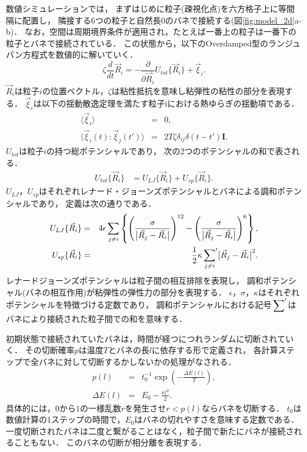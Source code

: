 数値シミュレーションでは，
まずはじめに粒子(疎視化点)を六方格子上に等間隔に配置し，
隣接する6つの粒子と自然長$0$のバネで接続する(図\ref{fig:model_2d}a-b)．
なお，空間は周期境界条件が適用され，たとえば一番上の粒子は一番下の粒子とバネで接続されている．
この状態から，以下のOverdamped型のランジュバン方程式を数値的に解いていく．
\begin{equation}
    \label{eq:main}
    \zeta
    \frac{d}{dt}
    \vec{R}_i
    =
    -\frac{\partial}{\partial\vec{R}_i}
    U_{tot}\{\vec{R}_i\}
    +\vec{\xi}_i
    .
\end{equation}
$\vec{R}_i$は粒子$i$の位置ベクトル，$\zeta$は粘性抵抗を意味し粘弾性の粘性の部分を表現する．
$\vec{\xi}_i$は以下の揺動散逸定理を満たす粒子iにおける熱ゆらぎの揺動項である．
\begin{eqnarray}
    \label{eq:langevin0}
    \langle\vec{\xi}_i\rangle &=& 0, \\
    \label{eq:langevin1}
    \langle\vec{\xi}_i(t):\vec{\xi}_j(t')\rangle &=& 2T\zeta\delta_{ij}\delta(t-t')\bm{I}.
\end{eqnarray}
$U_{tot}$は粒子$i$の持つ総ポテンシャルであり，
次の2つのポテンシャルの和で表される．
\begin{eqnarray}
    U_{tot}\{\vec{R}_i\}
    &=
     U_{LJ}\{\vec{R}_i\}
    +U_{sp}\{\vec{R}_i\}.
\end{eqnarray}
$U_{LJ}$，$U_{sp}$はそれぞれレナード・ジョーンズポテンシャルとバネによる調和ポテンシャルであり，
定義は次の通りである．
\begin{eqnarray}
    U_{LJ}\{\vec{R}_i\}
    &=&
    4\epsilon\sum_{j\neq i}
    \left\{
    \left(
    \frac{\sigma}{\bigl|\vec{R}_j-\vec{R}_i\bigr|}
    \right)^{12}
    -
    \left(
    \frac{\sigma}{\bigl|\vec{R}_j-\vec{R}_i\bigr|}
    \right)^{6}
    \right\},
    \\
    U_{sp}\{\vec{R}_i\}
    &=&
    \frac{1}{2}
    \kappa
    \sideset{}{'}\sum_{j\neq i}
    \bigl|\vec{R}_j-\vec{R}_i\bigr|^{2}.
\end{eqnarray}
レナードジョーンズポテンシャルは粒子間の相互排除を表現し，
調和ポテンシャル(バネの相互作用)が粘弾性の弾性力の部分を表現する．
$\epsilon$，$\sigma$，$\kappa$はそれぞれポテンシャルを特徴づける定数であり，
調和ポテンシャルにおける記号$\sideset{}{'}\sum$はバネにより接続された粒子間での和を意味する．

初期状態で接続されていたバネは，時間が経つにつれランダムに切断されていく．
その切断確率$p$は温度$T$とバネの長$l$に依存する形で定義され，
各計算ステップで全バネに対して切断するかしないかの処理がなされる．
\begin{eqnarray}
    p(l)
    &=&
    t_0^{-1}
    \exp\left(-\frac{\Delta E(l)}{T}\right)
    ,\\
    \Delta E(l)
    &=&
    E_0-\frac{\kappa l^2}{2}
    .
\end{eqnarray}
具体的には，$0$から$1$の一様乱数$r$を発生させ$r<p(l)$ならバネを切断する．
$t_0$は数値計算の1ステップの時間で，$E_0$はバネの切れやすさを意味する定数である．
一度切断されたバネは二度と繋がることはなく，粒子間で新たにバネが接続されることもない．
このバネの切断が相分離を表現する．



